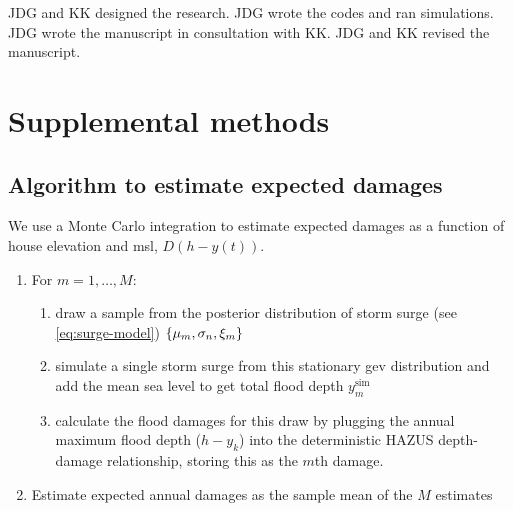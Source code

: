 \documentclass[11pt]{article}
\begin{document}
JDG and KK designed the research.
JDG wrote the codes and ran simulations.
JDG wrote the manuscript in consultation with KK.
JDG and KK revised the manuscript.

\printbibliography

\appendix
\newcommand{\hbAppendixPrefix}{S}
\renewcommand{\thefigure}{\hbAppendixPrefix\arabic{figure}}
\setcounter{figure}{0}
\renewcommand{\thetable}{\hbAppendixPrefix\arabic{table}}
\setcounter{table}{0}
\renewcommand{\theequation}{\hbAppendixPrefix\arabic{equation}}
\setcounter{equation}{0}

\newpage

\printglossary[type=\acronymtype,title=List of Abbreviations]

\section{Supplemental methods}

\subsection{Algorithm to estimate expected damages}\label{sec:alg-ead}

We use a Monte Carlo integration to estimate expected damages as a function of house elevation and \gls{msl}, $D(h-y(t))$.
\begin{enumerate}
    \item For $m=1, \ldots, M$:
          \begin{enumerate}
              \item draw a sample from the posterior distribution of storm surge (see \cref{eq:surge-model})  $\qty{ \mu_m, \sigma_n, \xi_m}$
              \item simulate a single storm surge from this stationary \gls{gev} distribution and add the mean sea level to get total flood depth $y^\mathrm{sim}_m$
              \item calculate the flood damages for this draw by plugging the annual maximum flood depth ($h - y_k$) into  the deterministic HAZUS depth-damage relationship, storing this as the $m$th damage.
          \end{enumerate}
    \item Estimate expected annual damages as the sample mean of the $M$ estimates
\end{enumerate}
\end{document}
